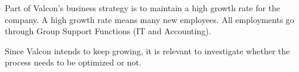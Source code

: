 Part of Valcon's business strategy is to maintain a high growth rate for the company.
A high growth rate means many new employees.
All employments go through Group Support Functions (IT and Accounting).

Since Valcon intends to keep growing, it is relevant to investigate whether the process needs to be optimized or not.